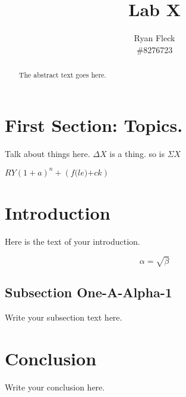 \documentclass[a4paper,12pt]{article}
\begin{document}
\title{Lab X}
\author{Ryan Fleck\\\#8276723}
\maketitle
\tableofcontents
\newpage
{}
\section{First Section: Topics.}
Talk about things here. $\Delta X$ is a thing. so is $\Sigma X$


\large${RY}{(1+\textit{a})^n + (\textit{f(le)+ck})}$

\begin{abstract}
The abstract text goes here.
\end{abstract}

\section{Introduction}
Here is the text of your introduction.

\begin{equation}
    \label{simple_equation}
    \alpha = \sqrt{ \beta }
\end{equation}

\subsection{Subsection One-A-Alpha-1}
Write your subsection text here.

\section{Conclusion}
Write your conclusion here.
\end{document}

